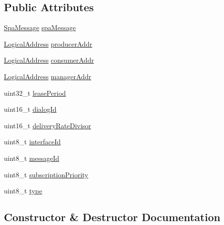 \subsection*{Public Attributes}
\begin{DoxyCompactItemize}
\item 
\hyperlink{structSpaMessage}{Spa\+Message} \hyperlink{structSubscriptionRequest_a33610286907a36d4ca8185a0208edcf8}{spa\+Message}
\item 
\hyperlink{structLogicalAddress}{Logical\+Address} \hyperlink{structSubscriptionRequest_af355bb5e7794b7c6613081982be6f72d}{producer\+Addr}
\item 
\hyperlink{structLogicalAddress}{Logical\+Address} \hyperlink{structSubscriptionRequest_ad686e1351ba99ca2a1ca4626f58bebac}{consumer\+Addr}
\item 
\hyperlink{structLogicalAddress}{Logical\+Address} \hyperlink{structSubscriptionRequest_a3b3f9db2899f3bec38a2d0c7ec8e6515}{manager\+Addr}
\item 
uint32\+\_\+t \hyperlink{structSubscriptionRequest_a3a7af51b8bf5ff34f09ed3599a19d0e1}{lease\+Period}
\item 
uint16\+\_\+t \hyperlink{structSubscriptionRequest_a7e6911856acf31c1367738e230524778}{dialog\+Id}
\item 
uint16\+\_\+t \hyperlink{structSubscriptionRequest_a85b4bd05a70308efe9dede88deef73de}{delivery\+Rate\+Divisor}
\item 
uint8\+\_\+t \hyperlink{structSubscriptionRequest_ab170a906e69ab9dbf8213a27e96276bd}{interface\+Id}
\item 
uint8\+\_\+t \hyperlink{structSubscriptionRequest_aee5c2ccd81b37daaad7d5aeeca12bdce}{message\+Id}
\item 
uint8\+\_\+t \hyperlink{structSubscriptionRequest_a5b8dd2c6614db580a69c675bc9016971}{subscription\+Priority}
\item 
uint8\+\_\+t \hyperlink{structSubscriptionRequest_a5603a9499051bd93fc94d729acb5785a}{type}
\end{DoxyCompactItemize}


\subsection{Constructor \& Destructor Documentation}
\mbox{\label{structSubscriptionRequest_a3b6895bbe1f616836913b7681b87a852}} 
